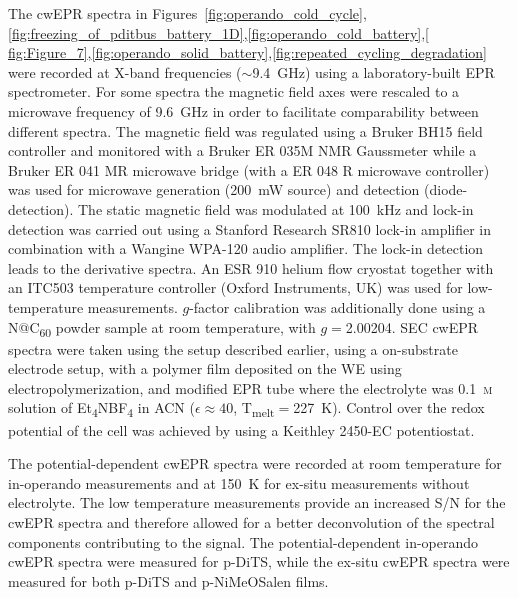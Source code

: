 The cwEPR spectra in Figures~\ref{fig:operando_cold_cycle},\ref{fig:freezing_of_pditbus_battery_1D},\ref{fig:operando_cold_battery},\ref{
fig:Figure_7},\ref{fig:operando_solid_battery},\ref{fig:repeated_cycling_degradation} were recorded at X-band frequencies ($\sim$9.4~GHz) using a laboratory-built EPR spectrometer. For some spectra the magnetic field axes were rescaled to a microwave frequency of 9.6~GHz in order to facilitate comparability between different spectra. The magnetic field was regulated using a Bruker BH15 field controller and monitored with a Bruker ER 035M NMR Gaussmeter while a Bruker ER 041 MR microwave bridge (with a ER 048 R microwave controller) was used for microwave generation (200~mW source) and detection (diode-detection). The static magnetic field was modulated at 100~kHz and lock-in detection was carried out using a Stanford Research SR810 lock-in amplifier in combination with a Wangine WPA-120 audio amplifier. The lock-in detection leads to the derivative spectra. An ESR 910 helium flow cryostat together with an ITC503 temperature controller (Oxford Instruments, UK) was used for low-temperature measurements. $g$-factor calibration was additionally done using a N@C\textsubscript{60} powder sample at room temperature, with $g= $2.00204.\cite{si_Wittmann2018_JMagnReson} SEC cwEPR spectra were taken using the setup described earlier, using a on-substrate electrode setup, with a polymer film deposited on the WE using electropolymerization, and modified EPR tube where the electrolyte was 0.1~\textsc{m} solution of Et\textsubscript{4}NBF\textsubscript{4} in ACN ($\epsilon\approx40$, T\textsubscript{melt}$=$227~K). Control over the redox potential of the cell was achieved by using a Keithley 2450-EC potentiostat.\\

\par
The potential-dependent cwEPR spectra were recorded at room temperature for in-operando measurements and at 150~K for ex-situ measurements without electrolyte. The low temperature measurements provide an increased S/N for the cwEPR spectra and therefore allowed for a better deconvolution of the spectral components contributing to the signal. The potential-dependent in-operando cwEPR spectra were measured for p-DiTS, while the ex-situ cwEPR spectra were measured for both p-DiTS and p-NiMeOSalen films.


